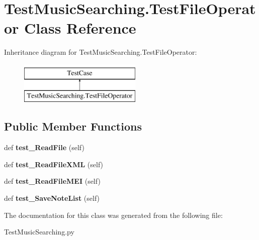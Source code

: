 \hypertarget{class_test_music_searching_1_1_test_file_operator}{}\section{Test\+Music\+Searching.\+Test\+File\+Operator Class Reference}
\label{class_test_music_searching_1_1_test_file_operator}
Inheritance diagram for Test\+Music\+Searching.\+Test\+File\+Operator\+:\begin{figure}[H]
\begin{center}
\leavevmode
\includegraphics[height=2.000000cm]{class_test_music_searching_1_1_test_file_operator}
\end{center}
\end{figure}
\subsection*{Public Member Functions}
\begin{DoxyCompactItemize}
\item 
\mbox{\label{class_test_music_searching_1_1_test_file_operator_a410cfe52ae5d4878490e25e8b715cb46}} 
def {\bfseries test\+\_\+\+Read\+File} (self)
\item 
\mbox{\label{class_test_music_searching_1_1_test_file_operator_abc1e70ea469686a38b1e62de0f431a9e}} 
def {\bfseries test\+\_\+\+Read\+File\+X\+ML} (self)
\item 
\mbox{\label{class_test_music_searching_1_1_test_file_operator_a2d3ed765f4eaf625cdc221d5853bfe09}} 
def {\bfseries test\+\_\+\+Read\+File\+M\+EI} (self)
\item 
\mbox{\label{class_test_music_searching_1_1_test_file_operator_a9f620adfa9fe90fbaf37d7d54da9404e}} 
def {\bfseries test\+\_\+\+Save\+Note\+List} (self)
\end{DoxyCompactItemize}


The documentation for this class was generated from the following file\+:\begin{DoxyCompactItemize}
\item 
Test\+Music\+Searching.\+py\end{DoxyCompactItemize}
